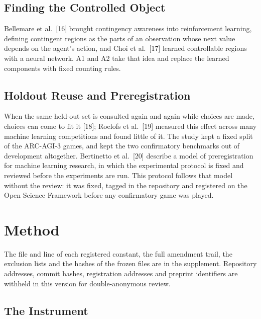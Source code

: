 \documentclass[journal]{IEEEtran}
\begin{document}
\subsection{Finding the Controlled
Object}\label{finding-the-controlled-object}

Bellemare et al.~{[}16{]} brought contingency awareness into
reinforcement learning, defining contingent regions as the parts of an
observation whose next value depends on the agent's action, and Choi et
al.~{[}17{]} learned controllable regions with a neural network. A1 and
A2 take that idea and replace the learned components with fixed counting
rules.

\subsection{Holdout Reuse and
Preregistration}\label{holdout-reuse-and-preregistration}

When the same held-out set is consulted again and again while choices
are made, choices can come to fit it {[}18{]}; Roelofs et al.~{[}19{]}
measured this effect across many machine learning competitions and found
little of it. The study kept a fixed split of the ARC-AGI-3 games, and
kept the two confirmatory benchmarks out of development altogether.
Bertinetto et al.~{[}20{]} describe a model of preregistration for
machine learning research, in which the experimental protocol is fixed
and reviewed before the experiments are run. This protocol follows that
model without the review: it was fixed, tagged in the repository and
registered on the Open Science Framework before any confirmatory game
was played.

\section{Method}\label{method}

The file and line of each registered constant, the full amendment trail,
the exclusion lists and the hashes of the frozen files are in the
supplement. Repository addresses, commit hashes, registration addresses
and preprint identifiers are withheld in this version for
double-anonymous review.

\subsection{The Instrument}\label{the-instrument}
\end{document}
